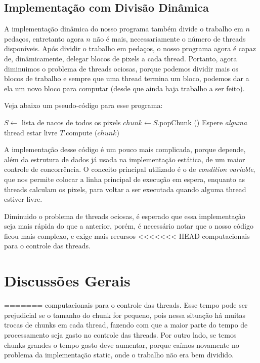 \documentclass[12pt]{article}
\begin{document}
\subsection{Implementação com Divisão Dinâmica}
A implementação dinâmica do nosso programa também divide o trabalho em
$n$ pedaços, entretanto agora $n$ não é mais, necessariamente o número
de threads disponíveis. Após dividir o trabalho em pedaços, o nosso 
programa agora é capaz de, dinâmicamente, delegar blocos de pixels a 
cada thread. Portanto, agora diminuimos o problema de threads ociosas,
porque podemos dividir mais os blocos de trabalho e sempre que uma 
thread termina um bloco, podemos dar a ela um novo bloco para computar 
(desde que ainda haja trabalho a ser feito).

Veja abaixo um pseudo-código para esse programa:
\begin{algorithmic}[1]
    \State $S \gets $ lista de nacos de todos os pixels
        \State $chunk \gets S$.popChunk ()
        \State Espere {\em alguma} thread estar livre
                \State $T$.compute ($chunk$)
            \EndIf
        \EndFor
    \EndWhile 
    \EndFunction
\end{algorithmic}

A implementação desse código é um pouco mais complicada, porque depende,
além da estrutura de dados já usada na implementação estática, de um 
maior controle de concorrência. O conceito principal utilizado é o de 
{\em condition variable}, que nos permite colocar a linha principal de
execução em espera, enquanto as threads calculam os pixels, para voltar
a ser executada quando alguma thread estiver livre.

Diminuido o problema de threads ociosas, é esperado que essa 
implementação seja mais rápida do que a anterior, porém, é necessário 
notar que o nosso código ficou mais complexo, e exige mais recursos
<<<<<<< HEAD
computacionais para o controle das threads.
\newpage

\newpage
\section{Discussões Gerais}
\newpage

\newpage
=======
computacionais para o controle das threads. Esse tempo pode ser 
prejudicial se o tamanho do chunk for pequeno, pois nessa situação
há muitas trocas de chunks em cada thread, fazendo com que a maior parte
do tempo de processamento seja gasto no controle das threads. Por outro
lado, se temos chunks grandes o tempo gasto deve aumentar, porque caímos
novamente no problema da implementação static, onde o trabalho não era
bem dividido.
\end{document}
